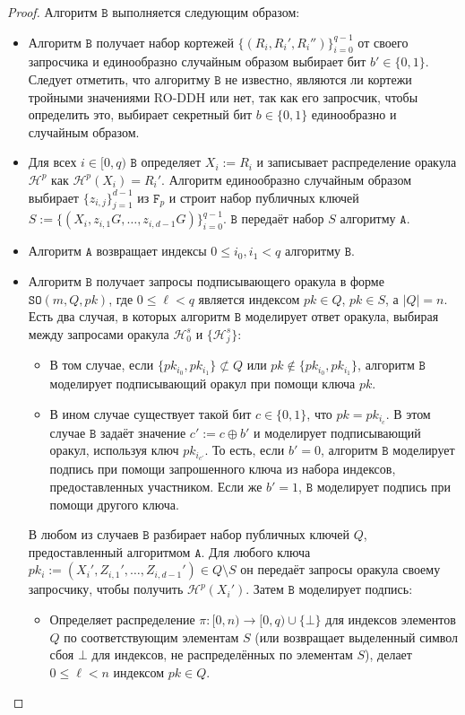 \documentclass{llncs}
\newcommand{\A}{\texttt{A}}
\newcommand{\B}{\texttt{B}}
\newcommand{\F}{\texttt{F}_p}
\newcommand{\Hp}{\mathcal{H}^p}
\newcommand{\Hs}{\mathcal{H}^s}
\begin{document}
\begin{proof}
Алгоритм $\B$ выполняется следующим образом:
\begin{itemize}
\item Алгоритм $\B$ получает набор кортежей $\{(R_i,R_i',R_i'')\}_{i=0}^{q-1}$ от своего запросчика и единообразно случайным образом выбирает бит $b' \in \{0,1\}$. Следует отметить, что алгоритму $\B$ не известно, являются ли кортежи тройными значениями RO-DDH или нет, так как его запросчик, чтобы определить это, выбирает секретный бит $b \in \{0,1\}$ единообразно и случайным образом.
\item Для всех $i \in [0,q)$ $\B$ определяет $X_i := R_i$ и записывает распределение оракула $\Hp$ как $\Hp(X_i) = R_i'$. Алгоритм единообразно случайным образом выбирает $\{z_{i,j}\}_{j=1}^{d-1}$ из $\F$ и строит набор публичных ключей $S := \{(X_i, z_{i,1}G, \ldots, z_{i,d-1}G)\}_{i=0}^{q-1}$. $\B$ передаёт набор $S$ алгоритму $\A$.
\item Алгоритм $\A$ возвращает индексы $0 \leq i_0,i_1 < q$ алгоритму $\B$.
\item Алгоритм $\B$ получает запросы подписывающего оракула в форме \linebreak $\texttt{SO}(m,Q,pk)$, где $0 \leq \ell < q$ является индексом $pk \in Q$, $pk \in S$, а $|Q| = n$. Есть два случая, в которых алгоритм $\B$ моделирует ответ оракула, выбирая между запросами оракула $\Hs_0$ и $\{\Hs_j\}$:
\begin{itemize}
\item В том случае, если $\{pk_{i_0},pk_{i_1}\} \not\subset Q$ или $pk \not\in \{pk_{i_0},pk_{i_1}\}$, алгоритм $\B$ моделирует подписывающий оракул при помощи ключа $pk$.
\item В ином случае существует такой бит $c \in \{0,1\}$, что $pk = pk_{i_c}$. В этом случае $\B$ задаёт значение $c' := c \oplus b'$ и моделирует подписывающий оракул, используя ключ $pk_{i_{c'}}$. То есть, если $b' = 0$, алгоритм $\B$ моделирует подпись при помощи запрошенного ключа из набора индексов, предоставленных участником. Если же $b' = 1$, $\B$ моделирует подпись при помощи другого ключа.
\end{itemize}
В любом из случаев $\B$ разбирает набор публичных ключей $Q$, предоставленный алгоритмом $\A$. Для любого ключа $pk_i := (X_i',Z_{i,1}',\ldots,Z_{i,d-1}') \in Q \setminus S$ он передаёт запросы оракула своему запросчику, чтобы получить $\Hp(X_i')$. Затем $\B$ моделирует подпись:
\begin{itemize}
\item Определяет распределение $\pi: [0,n) \to [0,q) \cup \{\bot\}$ для индексов элементов $Q$ по соответствующим элементам $S$ (или возвращает выделенный символ сбоя $\bot$ для индексов, не распределённых по элементам $S$), делает $0 \leq \ell < n$ индексом $pk \in Q$.

\end{itemize}
\end{itemize}
\end{proof}
\end{document}
